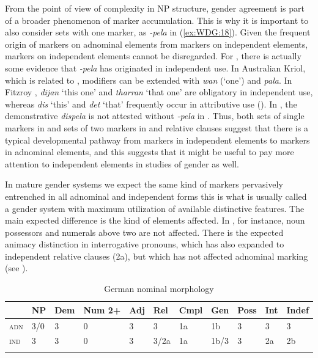 \documentclass[output=collectionpaper]{langsci/langscibook}
\begin{document}
From the point of view of complexity in NP structure, gender agreement is part of a broader phenomenon of marker accumulation. This is why it is important to also consider sets with one marker, as  \textit{-pela} in (\ref{ex:WDG:18}). Given the frequent origin of markers on adnominal elements from markers on independent elements, markers on independent elements cannot be disregarded. For , there is actually some evidence that \textit{-pela} has originated in independent use. In Australian Kriol, which is related to , modifiers can be extended with \textit{wan} (`one') and \textit{pala}. In Fitzroy , \textit{dijan} `this one' and \textit{tharran} `that one' are obligatory in independent use, whereas \textit{dis} `this' and \textit{det} `that' frequently occur in attributive use (\citealt[79]{Hudson1985}). In , the demonstrative \textit{dispela} is not attested without \textit{-pela} in \cite{Verhaar1995}. Thus, both sets of single markers in  and sets of two markers in  and  relative clauses suggest that there is a typical developmental pathway from markers in independent elements to markers in adnominal elements, and this suggests that it might be useful to pay more attention to independent elements in studies of gender as well.

In mature gender systems we expect the same kind of markers pervasively entrenched in all adnominal and independent forms \textendash{} this is what is usually called a gender system with maximum utilization of available distinctive features. The main expected difference is the kind of elements affected. In , for instance, noun possessors and numerals above two are not affected. There is the expected animacy distinction in interrogative pronouns, which has also expanded to independent relative clauses (2a), but which has not affected adnominal marking (see ).


\begin{table}
\begin{tabular}{*{11}{l}}
  \lsptoprule
& NP & Dem & Num 2+ & Adj & Rel & Cmpl & Gen & Poss & Int & Indef \\
\midrule
\textsc{adn} & 3/0 & 3 & 0 & 3 & 3 & 1a & 1b & 3 & 3 & 3 \\
\textsc{ind} & 3 & 3 & 0 & 3 & 3/2a & 1a & 1b/3 & 3 & 2a & 2b \\
\lspbottomrule
\end{tabular}
\caption{German nominal morphology}
\label{tab:WDG:2}
\end{table}
\end{document}
